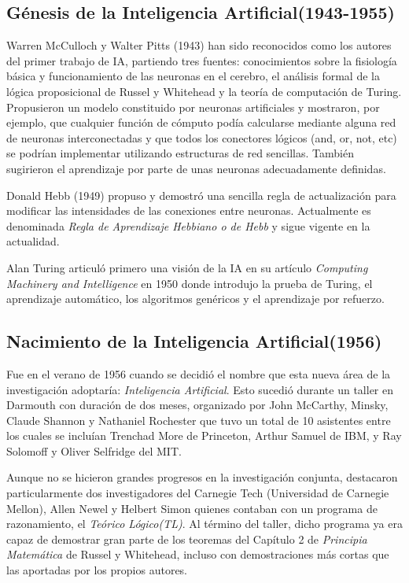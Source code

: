 \documentclass[12pt,a4paper]{article}
\begin{document}
\subsection{Génesis de la Inteligencia Artificial(1943-1955)}
Warren McCulloch y Walter Pitts (1943) han sido reconocidos como los autores del primer trabajo de IA, partiendo tres fuentes: conocimientos sobre la fisiología básica y funcionamiento de las neuronas en el cerebro, el análisis formal de la lógica proposicional de Russel y Whitehead y la teoría de computación de Turing. Propusieron un modelo constituido por neuronas artificiales y mostraron, por ejemplo, que cualquier función de cómputo podía calcularse mediante alguna red de neuronas interconectadas y que todos los conectores lógicos (and, or, not, etc) se podrían implementar utilizando estructuras de red sencillas. También sugirieron el aprendizaje por parte de unas neuronas adecuadamente definidas.

Donald Hebb (1949) propuso y demostró una sencilla regla de actualización para modificar las intensidades de las conexiones entre neuronas. Actualmente es denominada \emph{Regla de Aprendizaje Hebbiano o de Hebb} y sigue vigente en la actualidad.

Alan Turing articuló primero una visión de la IA en su artículo \emph{Computing Machinery and Intelligence} en 1950 donde introdujo la prueba de Turing, el aprendizaje automático, los algoritmos genéricos y el aprendizaje por refuerzo.

\subsection{Nacimiento de la Inteligencia Artificial(1956)}
Fue en el verano de 1956 cuando se decidió el nombre que esta nueva área de la investigación adoptaría: \emph{Inteligencia Artificial}. Esto sucedió durante un taller en Darmouth con duración de dos meses, organizado por John McCarthy, Minsky, Claude Shannon y Nathaniel Rochester que tuvo un total de 10 asistentes entre los cuales se incluían Trenchad More de Princeton, Arthur Samuel de IBM, y Ray Solomoff y Oliver Selfridge del MIT.

Aunque no se hicieron grandes progresos en la investigación conjunta, destacaron particularmente dos investigadores del Carnegie Tech (Universidad de Carnegie Mellon), Allen Newel y Helbert Simon quienes contaban con un programa de razonamiento, el \emph{Teórico Lógico(TL)}. Al término del taller, dicho programa ya era capaz de demostrar gran parte de los teoremas del Capítulo 2 de \emph{Principia Matemática} de Russel y Whitehead, incluso con demostraciones más cortas que las aportadas por los propios autores.
\end{document}
